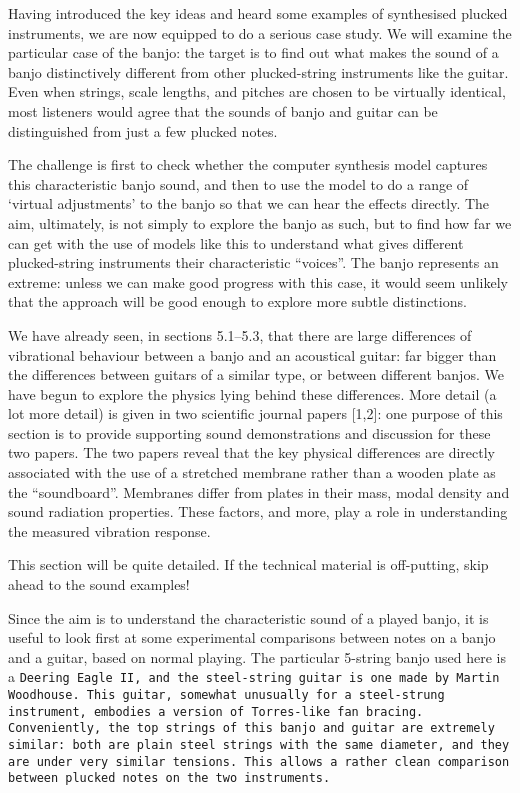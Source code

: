 

  Having introduced the key ideas and heard some examples of synthesised 
  plucked instruments, we are now equipped to do a serious case study. We will 
  examine the particular case of the banjo: the target is to find out what 
  makes the sound of a banjo distinctively different from other plucked-string 
  instruments like the guitar. Even when strings, scale lengths, and pitches 
  are chosen to be virtually identical, most listeners would agree that the 
  sounds of banjo and guitar can be distinguished from just a few plucked 
  notes. 

  The challenge is first to check whether the computer synthesis model captures 
  this characteristic banjo sound, and then to use the model to do a range of 
  `virtual adjustments' to the banjo so that we can hear the effects directly. 
  The aim, ultimately, is not simply to explore the banjo as such, but to find 
  how far we can get with the use of models like this to understand what gives 
  different plucked-string instruments their characteristic ``voices''. The 
  banjo represents an extreme: unless we can make good progress with this case, 
  it would seem unlikely that the approach will be good enough to explore more 
  subtle distinctions. 

  We have already seen, in sections 5.1--5.3, that there are large differences 
  of vibrational behaviour between a banjo and an acoustical guitar: far bigger 
  than the differences between guitars of a similar type, or between different 
  banjos. We have begun to explore the physics lying behind these differences. 
  More detail (a lot more detail) is given in two scientific journal papers 
  [1,2]: one purpose of this section is to provide supporting sound 
  demonstrations and discussion for these two papers. The two papers reveal 
  that the key physical differences are directly associated with the use of a 
  stretched membrane rather than a wooden plate as the ``soundboard''. 
  Membranes differ from plates in their mass, modal density and sound radiation 
  properties. These factors, and more, play a role in understanding the 
  measured vibration response. 

  This section will be quite detailed. If the technical material is 
  off-putting, skip ahead to the sound examples! 

    

  Since the aim is to understand the characteristic sound of a played banjo, it 
  is useful to look first at some experimental comparisons between notes on a 
  banjo and a guitar, based on normal playing. The particular 5-string banjo 
  used here is a \tt{}Deering Eagle II\rm{}, and the steel-string guitar is one 
  made by \tt{}Martin Woodhouse\rm{}. This guitar, somewhat 
  unusually for a steel-strung instrument, embodies a version of Torres-like 
  fan bracing. Conveniently, the top strings of this banjo and guitar are 
  extremely similar: both are plain steel strings with the same diameter, and 
  they are under very similar tensions. This allows a rather clean comparison 
  between plucked notes on the two instruments. 

